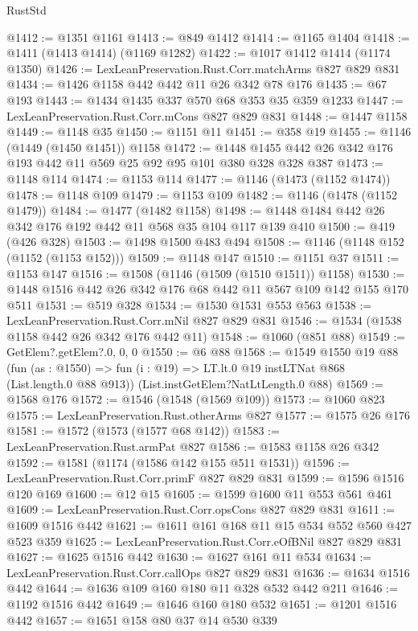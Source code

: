\begin{lexlean}{RustStd}
\begin{coremodule}
@1412 := @1351 @1161
@1413 := @849 @1412
@1414 := @1165 @1404
@1418 := @1411 (@1413 @1414) (@1169 @1282)
@1422 := @1017 @1412 @1414 (@1174 @1350)
@1426 := LexLeanPreservation.Rust.Corr.matchArms @827 @829 @831
@1434 := @1426 @1158 @442 @442 @11 @26 @342 @78 @176
@1435 := @67 @193
@1443 := @1434 @1435 @337 @570 @68 @353 @35 @359 @1233
@1447 := LexLeanPreservation.Rust.Corr.mCons @827 @829 @831
@1448 := @1447 @1158
@1449 := @1148 @35
@1450 := @1151 @11
@1451 := @358 @19
@1455 := @1146 (@1449 (@1450 @1451)) @1158
@1472 := @1448 @1455 @442 @26 @342 @176 @193 @442 @11 @569 @25 @92 @95 @101 @380 @328 @328 @387
@1473 := @1148 @114
@1474 := @1153 @114
@1477 := @1146 (@1473 (@1152 @1474))
@1478 := @1148 @109
@1479 := @1153 @109
@1482 := @1146 (@1478 (@1152 @1479))
@1484 := @1477 (@1482 @1158)
@1498 := @1448 @1484 @442 @26 @342 @176 @192 @442 @11 @568 @35 @104 @117 @139 @410
@1500 := @419 (@426 @328)
@1503 := @1498 @1500 @483 @494
@1508 := @1146 (@1148 @152 (@1152 (@1153 @152)))
@1509 := @1148 @147
@1510 := @1151 @37
@1511 := @1153 @147
@1516 := @1508 (@1146 (@1509 (@1510 @1511)) @1158)
@1530 := @1448 @1516 @442 @26 @342 @176 @68 @442 @11 @567 @109 @142 @155 @170 @511
@1531 := @519 @328
@1534 := @1530 @1531 @553 @563
@1538 := LexLeanPreservation.Rust.Corr.mNil @827 @829 @831
@1546 := @1534 (@1538 @1158 @442 @26 @342 @176 @442 @11)
@1548 := @1060 (@851 @88)
@1549 := GetElem?.getElem?.{0, 0, 0}
@1550 := @6 @88
@1568 := @1549
    @1550
    @19
    @88
    (fun (as : @1550) => fun (i : @19) => LT.lt.{0} @19 instLTNat @868 (List.length.{0} @88 @913))
    (List.instGetElem?NatLtLength.{0} @88)
@1569 := @1568 @176
@1572 := @1546 (@1548 (@1569 @109))
@1573 := @1060 @823
@1575 := LexLeanPreservation.Rust.otherArms @827
@1577 := @1575 @26 @176
@1581 := @1572 (@1573 (@1577 @68 @142))
@1583 := LexLeanPreservation.Rust.armPat @827
@1586 := @1583 @1158 @26 @342
@1592 := @1581 (@1174 (@1586 @142 @155 @511 @1531))
@1596 := LexLeanPreservation.Rust.Corr.primF @827 @829 @831
@1599 := @1596 @1516 @120 @169
@1600 := @12 @15
@1605 := @1599 @1600 @11 @553 @561 @461
@1609 := LexLeanPreservation.Rust.Corr.opsCons @827 @829 @831
@1611 := @1609 @1516 @442
@1621 := @1611 @161 @168 @11 @15 @534 @552 @560 @427 @523 @359
@1625 := LexLeanPreservation.Rust.Corr.eOfBNil @827 @829 @831
@1627 := @1625 @1516 @442
@1630 := @1627 @161 @11 @534
@1634 := LexLeanPreservation.Rust.Corr.callOps @827 @829 @831
@1636 := @1634 @1516 @442
@1644 := @1636 @109 @160 @180 @11 @328 @532 @442 @211
@1646 := @1192 @1516 @442
@1649 := @1646 @160 @180 @532
@1651 := @1201 @1516 @442
@1657 := @1651 @158 @80 @37 @14 @530 @339

\end{coremodule}
\end{lexlean}
